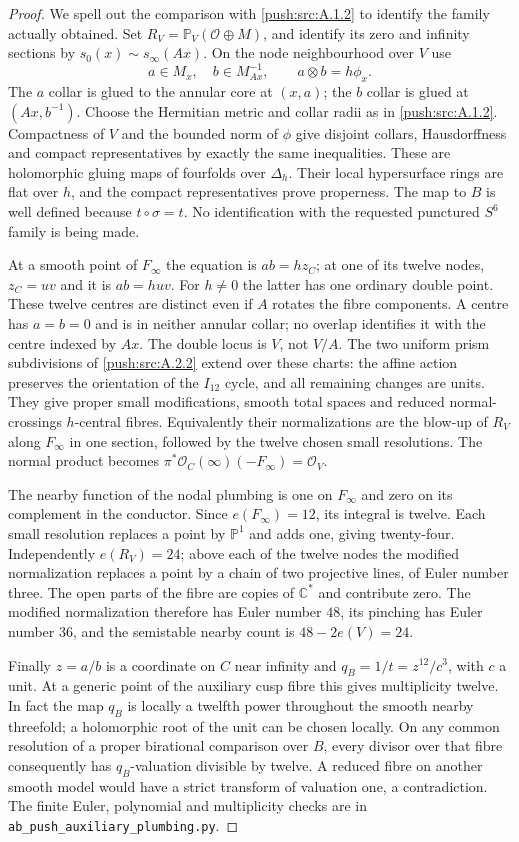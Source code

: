 \begin{proof}
We spell out the comparison with \ref{push:src:A.1.2}
to identify the family actually obtained.
Set $R_V=\mathbb P_V(\mathcal O\oplus M)$,
and identify its zero and infinity
sections by $s_0(x)\sim s_\infty(Ax)$.
On the node neighbourhood over $V$ use
\[
 a\in M_x,\quad b\in M_{Ax}^{-1},
 \qquad a\otimes b=h\phi_x.
\]
The $a$ collar is glued to the annular
core at $(x,a)$; the $b$ collar is glued
at $(Ax,b^{-1})$. Choose the Hermitian
metric and collar radii as in \ref{push:src:A.1.2}.
Compactness of $V$ and the bounded norm
of $\phi$ give disjoint collars,
Hausdorffness and compact representatives
by exactly the same inequalities.
These are holomorphic gluing maps of
fourfolds over $\Delta_h$.
Their local hypersurface rings are flat
over $h$, and the compact representatives
prove properness. The map to $B$ is
well defined because $t\circ\sigma=t$.
No identification with the requested
punctured $S^6$ family is being made.

At a smooth point of $F_\infty$ the
equation is $ab=hz_C$; at one of its
twelve nodes, $z_C=uv$ and it is
$ab=huv$. For $h\ne0$ the latter
has one ordinary double point.
These twelve centres are distinct
even if $A$ rotates the fibre
components. A centre has $a=b=0$
and is in neither annular collar;
no overlap identifies it with the
centre indexed by $Ax$.
The double locus is $V$, not $V/A$.
The two uniform prism subdivisions
of \ref{push:src:A.2.2} extend over these charts:
the affine action preserves the
orientation of the $I_{12}$ cycle,
and all remaining changes are units.
They give proper small modifications,
smooth total spaces and reduced
normal-crossings $h$-central fibres.
Equivalently their normalizations are
the blow-up of $R_V$ along $F_\infty$
in one section, followed by the twelve
chosen small resolutions. The normal
product becomes
$\pi^*\mathcal O_C(\infty)(-F_\infty)=\mathcal O_V$.

The nearby function of the nodal
plumbing is one on $F_\infty$ and
zero on its complement in the conductor.
Since $e(F_\infty)=12$, its integral
is twelve. Each small resolution
replaces a point by $\mathbb P^1$
and adds one, giving twenty-four.
Independently $e(R_V)=24$; above each
of the twelve nodes the modified
normalization replaces a point by
a chain of two projective lines,
of Euler number three. The open
parts of the fibre are copies of
$\mathbb C^*$ and contribute zero.
The modified normalization therefore
has Euler number $48$, its pinching
has Euler number $36$, and the
semistable nearby count is
$48-2e(V)=24$.

Finally $z=a/b$ is a coordinate on
$C$ near infinity and
$q_B=1/t=z^{12}/c^3$, with $c$ a unit.
At a generic point of the auxiliary
cusp fibre this gives multiplicity
twelve. In fact the map $q_B$ is
locally a twelfth power throughout
the smooth nearby threefold; a
holomorphic root of the unit can
be chosen locally. On any common
resolution of a proper birational
comparison over $B$, every divisor
over that fibre consequently has
$q_B$-valuation divisible by twelve.
A reduced fibre on another smooth
model would have a strict transform
of valuation one, a contradiction.
The finite Euler, polynomial and
multiplicity checks are in
\texttt{ab\_push\_auxiliary\_plumbing.py}.
\end{proof}

